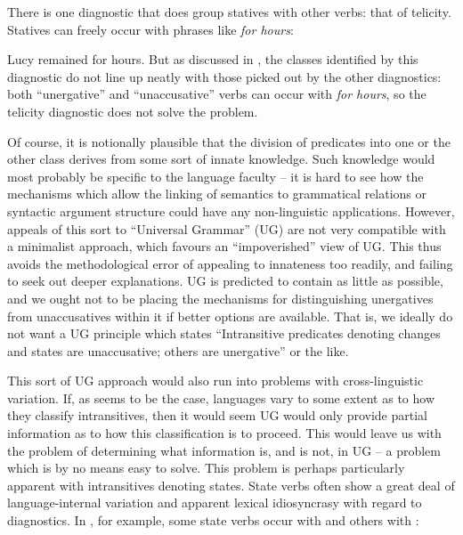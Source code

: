 \documentclass[output=paper]{langsci/langscibook}
\begin{document}
There is one diagnostic that does group statives with other verbs: that of
telicity. Statives can freely occur with phrases like \emph{for hours}:

\ea
    Lucy remained for hours.
\z
But as discussed in , the classes identified by this diagnostic do not
line up neatly with those picked out by the other diagnostics: both
\enquote{unergative} and \enquote{unaccusative} verbs can occur with \emph{for
hours}, so the telicity diagnostic does not solve the problem.

Of course, it is notionally plausible that the division of predicates into one
or the other class derives from some sort of innate knowledge. Such knowledge
would most probably be specific to the language faculty – it is hard to see how
the mechanisms which allow the linking of semantics to grammatical relations or
syntactic argument structure could have any non-linguistic applications.
However, appeals of this sort to \enquote{Universal Grammar} (\gls{UG}) are not very
compatible with a minimalist approach, which favours an \enquote{impoverished}
view of UG\@. This thus avoids the methodological error of appealing to
innateness too readily, and failing to seek out deeper explanations.  \gls{UG} is
predicted to contain as little as possible, and we ought not to be placing the
mechanisms for distinguishing unergatives from unaccusatives within it if
better options are available. That is, we ideally do not want a \gls{UG} principle
which states \enquote{Intransitive predicates denoting changes and states are
unaccusative; others are unergative} or the like.

This sort of \gls{UG} approach would also run into problems with cross-linguistic
variation. If, as seems to be the case, languages vary to some extent as to how
they classify intransitives, then it would seem \gls{UG} would only provide partial
information as to how this classification is to proceed. This would leave us
with the problem of determining what information is, and is not, in \gls{UG} – a
problem which is by no means easy to solve. This problem is perhaps
particularly apparent with intransitives denoting states. State verbs often
show a great deal of language-internal variation and apparent lexical
idiosyncrasy with regard to  diagnostics. In , for
example, some state verbs occur with \HAVE{} and others with \BE:
\end{document}
